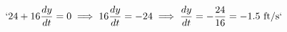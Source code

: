 \documentclass[preview]{standalone}
\begin{document}
\begin{align*}
`24 + 16\frac{dy}{dt} = 0 \implies 16\frac{dy}{dt} = -24 \implies \frac{dy}{dt} = -\frac{24}{16} = -1.5 \text{ ft/s}`
\end{align*}
\end{document}
